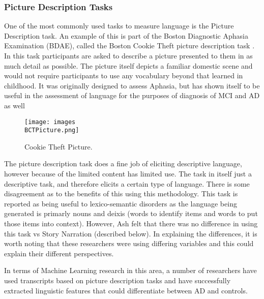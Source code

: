 \documentclass{article}
\begin{document}
\subsubsection{Picture Description Tasks}
One of the most commonly used tasks to measure language is the Picture Description task. An example of this is part of the Boston Diagnostic Aphasia Examination (BDAE), called the Boston Cookie Theft picture description task \cite{Kaplan2010}. In this task participants are asked to describe a picture presented to them in as much detail as possible. The picture itself depicts a familiar domestic scene and would not require participants to use any vocabulary beyond that learned in childhood. It was originally designed to assess Aphasia, but has shown itself to be useful in the assessment of language for the purposes of diagnosis of MCI and AD as well \cite{Giles1996}
\begin{figure}[H]
\centering
\texttt{[image: images\\BCTPicture.png]}
\caption{Cookie Theft Picture.\label{white}}
\end{figure}
\par
The picture description task does a fine job of eliciting descriptive language, however because of the limited content has limited use. The task in itself just a descriptive task, and therefore elicits a certain type of language. There is some disagreement as to the benefits of this using this methodology. This task is reported as being useful to lexico-semantic disorders \cite{Boschi2017, Sajjadi2012} as the language being generated is primarly nouns and deixis (words to identify items and words to put those items into context). However, Ash \cite{Ash2012}felt that there was no difference in using this task vs Story Narration (described below). In explaining the differences, it is worth noting that these researchers were using differing variables and this could explain their different perspectives.
\par
In terms of Machine Learning research in this area, a number of researchers have used transcripts based on picture description tasks \cite{Zimmerer2016, Orimaye2017, Mueller2018a, Fraser2015} and have successfully extracted linguistic features that could differentiate between AD and controls.
\par
\end{document}
